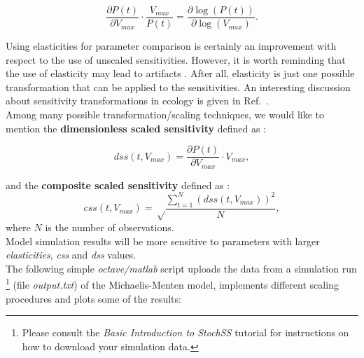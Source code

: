 \begin{equation}
\frac{\partial P(t)}{\partial V_{max}} \cdot \frac{V_{max}}{P(t)} = \frac{\partial \log(P(t))}{\partial\log(V_{max})}.
\end{equation}

Using elasticities for parameter comparison is certainly an improvement with respect to the use of unscaled sensitivities. However, it is worth reminding that the use of elasticity may lead to artifacts \cite{scale}. After all, elasticity is just one possible transformation that can be applied to the sensitivities. An interesting discussion about sensitivity transformations in ecology is given in Ref.~\cite{scale}. \\
Among many possible transformation/scaling techniques, we would like to mention the \textbf{dimensionless scaled sensitivity} defined as \cite{calib}:

\begin{equation}
dss(t, V_{max}) = \frac{\partial P(t)}{\partial V_{max}} \cdot V_{max},
\end{equation}

and the \textbf{composite scaled sensitivity} defined as \cite{calib}:
\begin{equation}
css(t,V_{max}) = \sqrt \frac{\sum_{t=1}^N \left(dss(t,V_{max})\right)^2}{N},
\end{equation}
where $N$ is the number of observations.\\
Model simulation results will be more sensitive to parameters with larger \textit{elasticities}, \textit{css} and \textit{dss} values.\\
The following simple \textit{octave/matlab} script uploads the data from a simulation run  \footnote{Please consult the \textit{Basic Introduction to StochSS} tutorial for instructions on how to download your simulation data.} (file \textit{output.txt}) of the Michaelis-Menten model, implements different scaling procedures and plots some of the results:

\newpage

